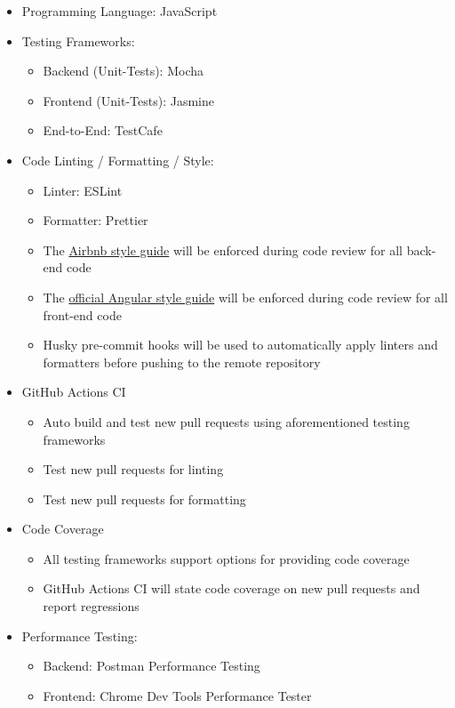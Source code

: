 \documentclass[12pt, titlepage]{article}
\begin{document}
\begin{itemize}
    \item Programming Language: JavaScript
    \item Testing Frameworks:
   \begin{itemize}
       \item Backend (Unit-Tests): Mocha
       \item Frontend (Unit-Tests): Jasmine
       \item End-to-End: TestCafe
   \end{itemize}
   \item Code Linting / Formatting / Style:
   \begin{itemize}
       \item Linter: ESLint
       \item Formatter: Prettier
        \item The \href{https://github.com/airbnb/javascript}{Airbnb style guide} will be enforced during code review for all back-end code
        \item The \href{https://angular.io/guide/styleguide}{official Angular style guide} will be enforced during code review for all front-end code
       \item Husky pre-commit hooks will be used to automatically apply linters and formatters before pushing to the remote repository
   \end{itemize}
\item GitHub Actions CI 
    \begin{itemize}
        \item Auto build and test new pull requests using aforementioned testing frameworks
        \item Test new pull requests for linting
        \item Test new pull requests for formatting
    \end{itemize}
\item Code Coverage
    \begin{itemize}
        \item All testing frameworks support options for providing code coverage
        \item GitHub Actions CI will state code coverage on new pull requests and report regressions
        
    \end{itemize}

\item Performance Testing: 
    \begin{itemize}
       \item Backend: Postman Performance Testing
       \item Frontend: Chrome Dev Tools Performance Tester
   \end{itemize}
\end{itemize}
\end{document}
